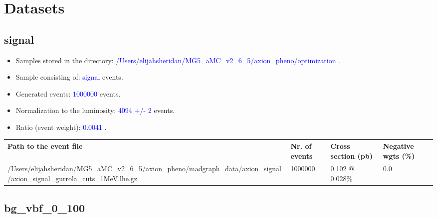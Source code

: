 \documentclass[a4paper, 10pt]{article}
\begin{document}
\section{ Datasets}

\subsection{ signal}

\begin{itemize}
  \item Samples stored in the directory: \textcolor{blue}{/\-Users/\-elijahsheridan/\-MG5\_aMC\_v2\_6\_5/\-axion\_pheno/\-optimization} .
   \item Sample consisting of: \textcolor{blue}{signal}  events.
   \item Generated events: \textcolor{blue}{1000000 }  events.
   \item Normalization to the luminosity: \textcolor{blue}{4094}\textcolor{blue}{ +/\-- }\textcolor{blue}{2 }  events.
   \item Ratio (event weight): \textcolor{blue}{0.0041 } .  
 
\end{itemize}
\begin{table}[H]
  \begin{center}
    \begin{tabular}{|m{55.0mm}|m{25.0mm}|m{30.0mm}|m{30.0mm}|}
      \hline
      {\cellcolor{yellow}         Path to the event file}& {\cellcolor{yellow}         Nr. of events}& {\cellcolor{yellow}         Cross section (pb)}& {\cellcolor{yellow}         Negative wgts (\%)}\\
      \hline
      {\cellcolor{white}          /\-Users/\-elijahsheridan/\-MG5\_aMC\_v2\_6\_5/\-axion\_pheno/\-madgraph\_data/\-axion\_signal/\-axion\_signal\_gurrola\_cuts\_1MeV.lhe.gz}& {\cellcolor{white}          1000000}& {\cellcolor{white}          0.102 @ 0.028\%}& {\cellcolor{white}          0.0}\\
\hline
    \end{tabular}
  \end{center}
\end{table}

\subsection{ bg\_vbf\_0\_100}
\end{document}
